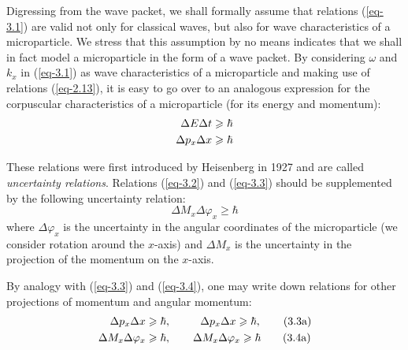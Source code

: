 \documentclass[a4paper,sfsidenotes,colorlinks=true]{tufte-book}
\numberwithin{equation}{section}
\numberwithin{figure}{section}
\begin{document}
Digressing from the wave packet, we shall formally assume that
relations (\ref{eq-3.1}) are valid not only for classical waves, but
also for wave characteristics of a microparticle. We stress that this
assumption by no means indicates that we shall in fact model a
microparticle in the form of a wave packet. By considering $\omega$ and $k_{x}$
in (\ref{eq-3.1}) as wave characteristics of a microparticle and making use of
relations (\ref{eq-2.13}), it is easy to go over to an analogous expression for
the corpuscular characteristics of a microparticle (for its energy
and momentum): 
\begin{align}%
\Delta E \Delta t &  \geqslant \hbar \label{eq-3.2}\\
\vspace{8pt}
\Delta p_{x} \Delta x &  \geqslant \hbar \label{eq-3.3}
\end{align}

These relations were first introduced by Heisenberg in 1927 and are
called \emph{uncertainty relations}. Relations (\ref{eq-3.2}) and
(\ref{eq-3.3}) should be supplemented by the following uncertainty
relation:
\begin{equation}
\Delta M_{x} \Delta \varphi_{x}  \geqslant \hbar
\label{eq-3.4}
\end{equation}
where $\Delta \varphi_{x}$ is the uncertainty in the angular
coordinates of the microparticle (we consider rotation around the
$x$-axis) and $\Delta M_{x}$ is the uncertainty in the projection of
the momentum on the $x$-axis.

By analogy with (\ref{eq-3.3}) and (\ref{eq-3.4}), one may write down relations for
other projections of momentum and angular momentum:
\begin{align}%
\Delta p_{x} \Delta x &  \geqslant \hbar, \quad \quad  \,\,\,\, \Delta p_{x}
\Delta x  \geqslant \hbar, \tag{3.3a} \label{eq-3.3a}\\
\vspace{8pt}
\Delta M_{x} \Delta \varphi_{x} & \geqslant \hbar, \quad \quad \Delta
M_{x} \Delta \varphi_{x} \geqslant \hbar \tag{3.4a} \label{eq-3.4a}
\end{align}
\end{document}
